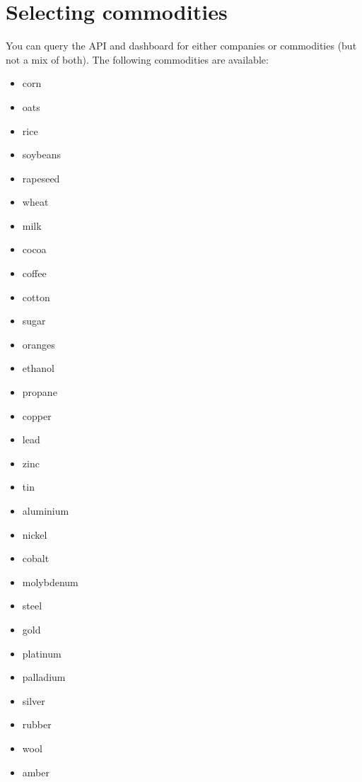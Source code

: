 \documentclass[]{book}
\providecommand{\tightlist}{%
  \setlength{\itemsep}{0pt}\setlength{\parskip}{0pt}}
\theoremstyle{definition}
\theoremstyle{definition}
\theoremstyle{definition}
\theoremstyle{remark}
\begin{document}
\section{Selecting commodities}\label{selecting-commodities}

You can query the API and dashboard for either companies or commodities
(but not a mix of both). The following commodities are available:

\begin{itemize}
\tightlist
\item
  corn
\item
  oats
\item
  rice\\
\item
  soybeans\\
\item
  rapeseed\\
\item
  wheat\\
\item
  milk\\
\item
  cocoa\\
\item
  coffee\\
\item
  cotton\\
\item
  sugar\\
\item
  oranges\\
\item
  ethanol\\
\item
  propane\\
\item
  copper\\
\item
  lead\\
\item
  zinc\\
\item
  tin\\
\item
  aluminium
\item
  nickel\\
\item
  cobalt\\
\item
  molybdenum
\item
  steel\\
\item
  gold\\
\item
  platinum
\item
  palladium
\item
  silver
\item
  rubber
\item
  wool
\item
  amber
\end{itemize}
\end{document}
